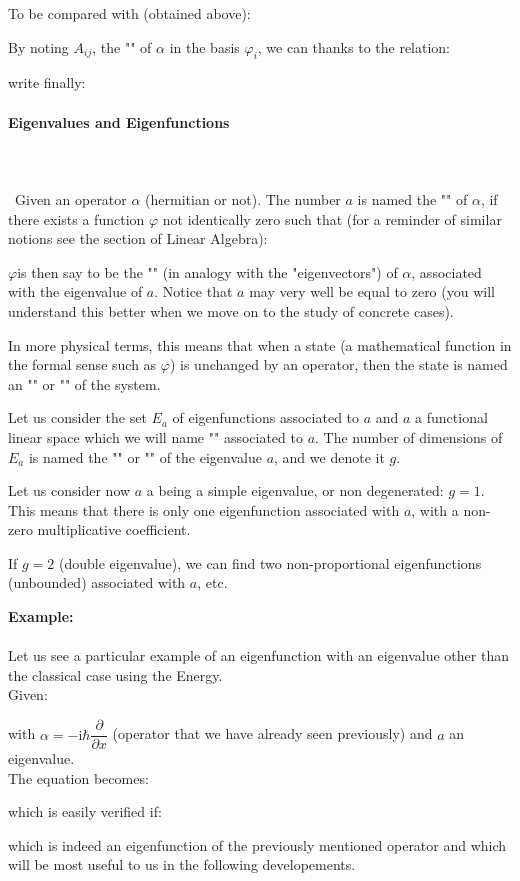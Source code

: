 	To be compared with (obtained above):
	
	By noting $A_{ij}$, the "" of $\alpha$ in the basis $\varphi_i$, we can thanks to the relation:
	
	write finally:
	
	
	\paragraph{Eigenvalues and Eigenfunctions}\mbox{}\\\\\
	Given an operator $\alpha$ (hermitian or not). The number $a$ is named the "" of $\alpha$, if there exists a function $\varphi$ not identically zero such that (for a reminder of similar notions see the section of Linear Algebra):

$\varphi $is then say to be the "" (in analogy with the "eigenvectors") of $\alpha$, associated with the eigenvalue of $a$. Notice that $a$ may very well be equal to zero (you will understand this better when we move on to the study of concrete cases).
	
	In more physical terms, this means that when a state (a mathematical function in the formal sense such as $\varphi$) is unchanged by an operator, then the state is named an "" or "" of the system.

	Let us consider the set $E_a$ of eigenfunctions associated to $a$ and $a$ a functional linear space which we will name "" associated to $a$. The number of dimensions of $E_a$ is named the "" or "" of the eigenvalue $a$, and we denote it $g$.

	Let us consider now $a$ a being a simple eigenvalue, or non degenerated: $g=1$. This means that there is only one eigenfunction associated with $a$, with a non-zero multiplicative coefficient.

	If $g=2$ (double eigenvalue), we can find two non-proportional eigenfunctions (unbounded) associated with $a$, etc.
	
	\begin{tcolorbox}[colframe=black,colback=white,sharp corners]
	\textbf{{\Large {}}Example:}\\\\
	Let us see a particular example of an eigenfunction with an eigenvalue other than the classical case using the Energy.\\
	
	Given:
	
	with $\alpha=-\mathrm{i}\hbar\dfrac{\partial}{\partial x}$ (operator that we have already seen previously) and $a$ an eigenvalue.\\

	The equation becomes:
	
	which is easily verified if:
	
	which is indeed an eigenfunction of the previously mentioned operator and which will be most useful to us in the following developements.
	\end{tcolorbox}
	
